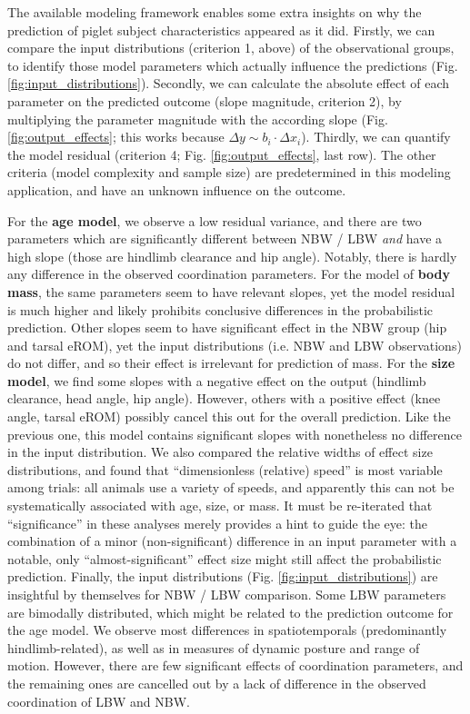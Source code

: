 \begin{change}
The available modeling framework enables some extra insights on why the prediction of piglet subject characteristics appeared as it did.
Firstly, we can compare the input distributions (criterion 1, above) of the observational groups, to identify those model parameters which actually influence the predictions (Fig. \ref{fig:input_distributions}).
Secondly, we can calculate the absolute effect of each parameter on the predicted outcome (slope magnitude, criterion 2), by multiplying the parameter magnitude with the according slope (Fig. \ref{fig:output_effects}; this works because \(\Delta y \sim b_i \cdot \Delta x_i\)).
Thirdly, we can quantify the model residual (criterion 4; Fig. \ref{fig:output_effects}, last row).
The other criteria (model complexity and sample size) are predetermined in this modeling application, and have an unknown influence on the outcome.

For the \textbf{age model}, we observe a low residual variance, and there are two parameters which are significantly different between NBW / LBW \textit{and} have a high slope (those are hindlimb clearance and hip angle).
Notably, there is hardly any difference in the observed coordination parameters.
For the model of \textbf{body mass}, the same parameters seem to have relevant slopes, yet the model residual is much higher and likely prohibits conclusive differences in the probabilistic prediction.
Other slopes seem to have significant effect in the NBW group (hip and tarsal eROM), yet the input distributions (i.e. NBW and LBW observations) do not differ, and so their effect is irrelevant for prediction of mass.
For the \textbf{size model}, we find some slopes with a negative effect on the output (hindlimb clearance, head angle, hip angle).
However, others with a positive effect (knee angle, tarsal eROM) possibly cancel this out for the overall prediction.
Like the previous one, this model contains significant slopes with nonetheless no difference in the input distribution.
We also compared the relative widths of effect size distributions, and found that ``dimensionless (relative) speed'' is most variable among trials: all animals use a variety of speeds, and apparently this can not be systematically associated with age, size, or mass.
It must be re-iterated that ``significance'' in these analyses merely provides a hint to guide the eye: the combination of a minor (non-significant) difference in an input parameter with a notable, only ``almost-significant'' effect size might still affect the probabilistic prediction.
Finally, the input distributions (Fig. \ref{fig:input_distributions}) are insightful by themselves for NBW / LBW comparison.
Some LBW parameters are bimodally distributed, which might be related to the prediction outcome for the age model.
We observe most differences in spatiotemporals (predominantly hindlimb-related), as well as in measures of dynamic posture and range of motion.
However, there are few significant effects of coordination parameters, and the remaining ones are cancelled out by a lack of difference in the observed coordination of LBW and NBW.



\end{change}
